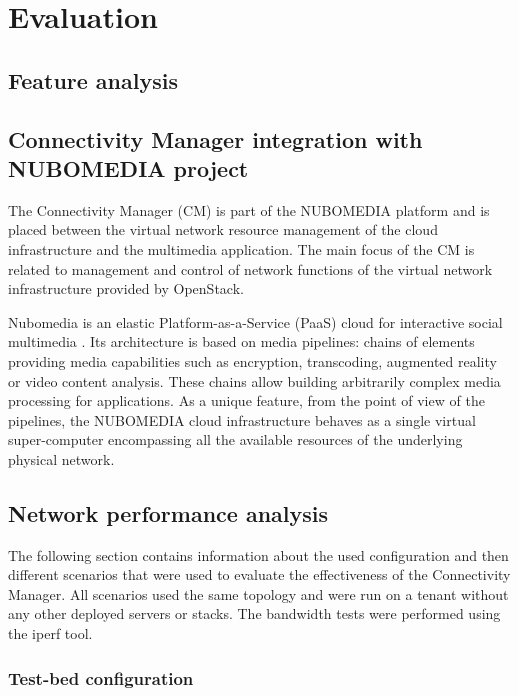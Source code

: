 \chapter{Evaluation}

\section{Feature analysis}



\section{Connectivity Manager integration with NUBOMEDIA project}


The Connectivity Manager (CM) is part of the NUBOMEDIA platform and is placed between the virtual network resource management of the cloud infrastructure and the
multimedia application. The main focus of the CM is related to management and control of network functions of the virtual network infrastructure provided by OpenStack.

Nubomedia is an elastic Platform-as-a-Service (PaaS) cloud for interactive social multimedia \cite{nubomedia}. Its architecture is based on media pipelines: chains of elements providing media capabilities such as encryption, transcoding, augmented reality or video content analysis. These chains allow building arbitrarily complex media processing for applications. As a unique feature, from the point of view of the pipelines, the NUBOMEDIA cloud infrastructure behaves as a single virtual super-computer encompassing all the available resources of the underlying physical network.

\section{Network performance analysis}

The following section contains information about the used configuration and then different scenarios that were used to evaluate the effectiveness of the Connectivity Manager. All scenarios used the same topology and were run on a tenant without any other deployed servers or stacks. The bandwidth tests were performed using the iperf tool.

\subsection{Test-bed configuration}

